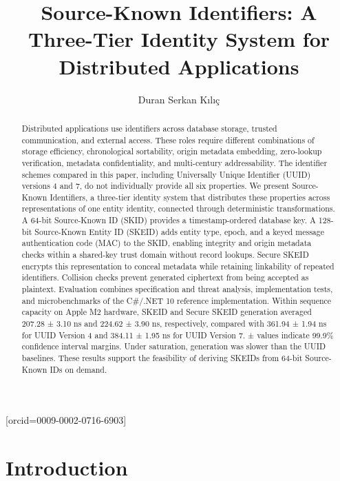 \documentclass[a4paper,fleqn]{cas-sc}
\begin{document}
\title[mode=title]{Source-Known Identifiers: A Three-Tier Identity
System for Distributed Applications}
\author[1]{Duran Serkan Kılıç}[orcid={0009-0002-0716-6903}]
\cormark[1]
\begin{abstract}
Distributed applications use identifiers across database storage,
trusted communication, and external access. These roles require
different combinations of storage efficiency, chronological sortability,
origin metadata embedding, zero-lookup verification, metadata
confidentiality, and multi-century addressability. The identifier
schemes compared in this paper, including Universally Unique Identifier
(UUID) versions 4 and 7, do not individually provide all six properties.
We present Source-Known Identifiers, a three-tier identity system that
distributes these properties across representations of one entity
identity, connected through deterministic transformations. A 64-bit
Source-Known ID (SKID) provides a timestamp-ordered database key. A
128-bit Source-Known Entity ID (SKEID) adds entity type, epoch, and a
keyed message authentication code (MAC) to the SKID, enabling integrity
and origin metadata checks within a shared-key trust domain without
record lookups. Secure SKEID encrypts this representation to conceal
metadata while retaining linkability of repeated identifiers. Collision
checks prevent generated ciphertext from being accepted as plaintext.
Evaluation combines specification and threat analysis, implementation
tests, and microbenchmarks of the C\#/.NET 10 reference implementation.
Within sequence capacity on Apple M2 hardware, SKEID and Secure SKEID
generation averaged 207.28 ± 3.10 ns and 224.62 ± 3.90 ns, respectively,
compared with 361.94 ± 1.94 ns for UUID Version 4 and 384.11 ± 1.95 ns
for UUID Version 7. ± values indicate 99.9\% confidence interval
margins. Under saturation, generation was slower than the UUID
baselines. These results support the feasibility of deriving SKEIDs from
64-bit Source-Known IDs on demand.
\end{abstract}
\maketitle

\raggedbottom

\newpage

\section{Introduction}\label{introduction}
\end{document}
